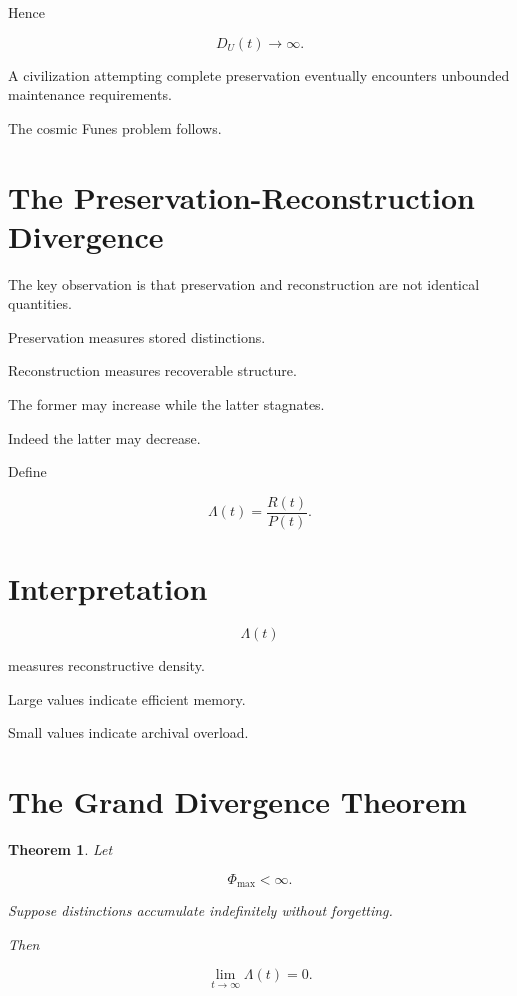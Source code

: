 \documentclass[12pt,oneside]{book}
\theoremstyle{plain} \newtheorem{theorem}{Theorem}[chapter] \newtheorem{lemma}[theorem]{Lemma} \newtheorem{proposition}[theorem]{Proposition} \newtheorem{corollary}[theorem]{Corollary}
\theoremstyle{definition} \newtheorem{definition}[theorem]{Definition} \newtheorem{axiom}[theorem]{Axiom} \newtheorem{construction}[theorem]{Construction}
\theoremstyle{remark} \newtheorem{remark}[theorem]{Remark} \newtheorem{example}[theorem]{Example}
\begin{document}
Hence

\[
D_U(t)
\rightarrow
\infty.
\]

A civilization attempting complete preservation eventually encounters unbounded maintenance requirements.

The cosmic Funes problem follows.

\section{The Preservation-Reconstruction Divergence}

The key observation is that preservation and reconstruction are not identical quantities.

Preservation measures stored distinctions.

Reconstruction measures recoverable structure.

The former may increase while the latter stagnates.

Indeed the latter may decrease.

Define

\[
\Lambda(t)
=
\frac{R(t)}
{P(t)}.
\]

\section{Interpretation}

\[
\Lambda(t)
\]

measures reconstructive density.

Large values indicate efficient memory.

Small values indicate archival overload.

\section{The Grand Divergence Theorem}

\begin{theorem}

Let

\[
\Phi_{\max}
<
\infty.
\]

Suppose distinctions accumulate indefinitely without forgetting.

Then

\[
\lim_{t\rightarrow\infty}
\Lambda(t)
=
0. 

\]

\end{theorem}
\end{document}
